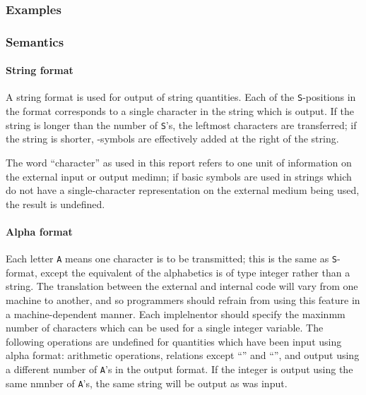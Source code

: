 \documentclass[a4paper,11pt]{article}
\begin{document}
\subsubsection{Examples}



\subsubsection{Semantics}

\paragraph{String format}

A string format is used for output of string quantities.  Each of the
{\tt S}-positions in the format corresponds to a single character in
the string which is output.  If the string is longer than the number
of {\tt S}'s, the leftmost characters are transferred; if the string
is shorter, \blankchar{}-symbols are effectively added at the right of
the string.

The word ``character'' as used in this report refers to one unit of
information on the external input or output medimn; if \Algol basic
symbols are used in strings which do not have a single-character
representation on the external medium being used, the result is
undefined.

\paragraph{Alpha format}
\label{Lbl++Formats+Other+Semantics+Alpha}

Each letter {\tt A} means one character is to be transmitted; this is
the same as {\tt S}-format, except the \Algol equivalent of the
alphabetics is of type integer rather than a string.  The translation
between the external and internal code will vary from one machine to
another, and so programmers should refrain from using this feature in
a machine-dependent manner.  Each implelnentor should specify the
maxinmm number of characters which can be used for a single integer
variable.  The following operations are undefined for quantities which
have been input using alpha format: arithmetic operations, relations
except ``\meq'' and ``\mne'', and output using a different number of
{\tt A}'s in the output format.  If the integer is output using the
same nmnber of {\tt A}'s, the same string will be output as was input.
\end{document}
